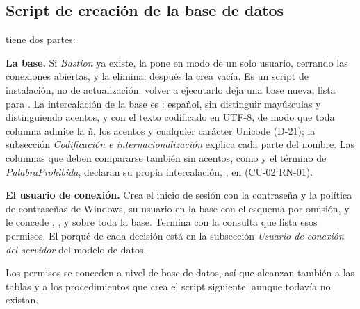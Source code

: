 \subsection*{Script de creación de la base de datos}

 tiene dos partes:

\begin{reglas}
  \item \textbf{La base.} Si \textit{Bastion} ya existe, la pone en modo de un solo usuario, cerrando las conexiones abiertas, y la elimina; después la crea vacía. Es un script de instalación, no de actualización: volver a ejecutarlo deja una base nueva, lista para . La intercalación de la base es : español, sin distinguir mayúsculas y distinguiendo acentos, y con el texto codificado en UTF-8, de modo que toda columna admite la ñ, los acentos y cualquier carácter Unicode (\mbox{D-21}); la subsección \textit{Codificación e internacionalización} explica cada parte del nombre. Las columnas que deben compararse también sin acentos, como  y el término de \textit{PalabraProhibida}, declaran su propia intercalación, , en  (\mbox{CU-02} \mbox{RN-01}).
  \item \textbf{El usuario de conexión.} Crea el inicio de sesión  con la contraseña  y la política de contraseñas de Windows, su usuario en la base con el esquema  por omisión, y le concede , ,  y  sobre toda la base. Termina con la consulta que lista esos permisos. El porqué de cada decisión está en la subsección \textit{Usuario de conexión del servidor} del modelo de datos.
\end{reglas}

Los permisos se conceden a nivel de base de datos, así que alcanzan también a las tablas y a los procedimientos que crea el script siguiente, aunque todavía no existan.


